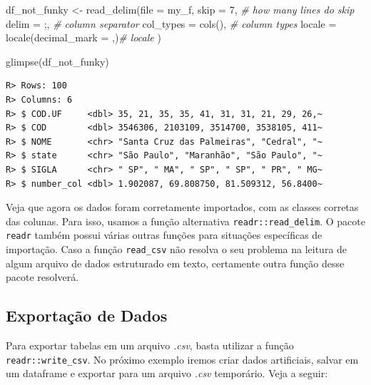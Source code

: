\documentclass[
  11pt,
]{book}
\newenvironment{Shaded}{\begin{snugshade}}{\end{snugshade}}
\newcommand{\AttributeTok}[1]{\textcolor[rgb]{0.61,0.61,0.61}{#1}}
\newcommand{\CommentTok}[1]{\textcolor[rgb]{0.37,0.37,0.37}{\textit{#1}}}
\newcommand{\DecValTok}[1]{\textcolor[rgb]{0.06,0.06,0.06}{#1}}
\newcommand{\FunctionTok}[1]{\textcolor[rgb]{0,0,0}{#1}}
\newcommand{\NormalTok}[1]{#1}
\newcommand{\OtherTok}[1]{\textcolor[rgb]{0.37,0.37,0.37}{#1}}
\newcommand{\StringTok}[1]{\textcolor[rgb]{0.5,0.5,0.5}{#1}}
\begin{document}
\begin{Shaded}
\begin{Highlighting}[]
\NormalTok{df\_not\_funky }\OtherTok{\textless{}{-}} \FunctionTok{read\_delim}\NormalTok{(}\AttributeTok{file =}\NormalTok{ my\_f, }
                           \AttributeTok{skip =} \DecValTok{7}\NormalTok{, }\CommentTok{\# how many lines do skip}
                           \AttributeTok{delim =} \StringTok{\textquotesingle{};\textquotesingle{}}\NormalTok{, }\CommentTok{\# column separator}
                           \AttributeTok{col\_types =} \FunctionTok{cols}\NormalTok{(), }\CommentTok{\# column types}
                           \AttributeTok{locale =} \FunctionTok{locale}\NormalTok{(}\AttributeTok{decimal\_mark =} \StringTok{\textquotesingle{},\textquotesingle{}}\NormalTok{)}\CommentTok{\# locale}
\NormalTok{)}

\FunctionTok{glimpse}\NormalTok{(df\_not\_funky)}
\end{Highlighting}
\end{Shaded}

\begin{verbatim}
R> Rows: 100
R> Columns: 6
R> $ COD.UF     <dbl> 35, 21, 35, 35, 41, 31, 31, 21, 29, 26,~
R> $ COD        <dbl> 3546306, 2103109, 3514700, 3538105, 411~
R> $ NOME       <chr> "Santa Cruz das Palmeiras", "Cedral", "~
R> $ state      <chr> "São Paulo", "Maranhão", "São Paulo", "~
R> $ SIGLA      <chr> " SP", " MA", " SP", " SP", " PR", " MG~
R> $ number_col <dbl> 1.902087, 69.808750, 81.509312, 56.8400~
\end{verbatim}

Veja que agora os dados foram corretamente importados, com as classes corretas das colunas. Para isso, usamos a função alternativa \texttt{readr::read\_delim}. O pacote \texttt{readr} também possui várias outras funções para situações específicas de importação. Caso a função \texttt{read\_csv} não resolva o seu problema na leitura de algum arquivo de dados estruturado em texto, certamente outra função desse pacote resolverá.

\hypertarget{exportauxe7uxe3o-de-dados}{%
\subsection{Exportação de Dados}\label{exportauxe7uxe3o-de-dados}}

Para exportar tabelas em um arquivo \emph{.csv}, basta utilizar a função \texttt{readr::write\_csv}. No próximo exemplo iremos criar dados artificiais, salvar em um dataframe e exportar para um arquivo \emph{.csv} temporário. Veja a seguir: 
\end{document}
